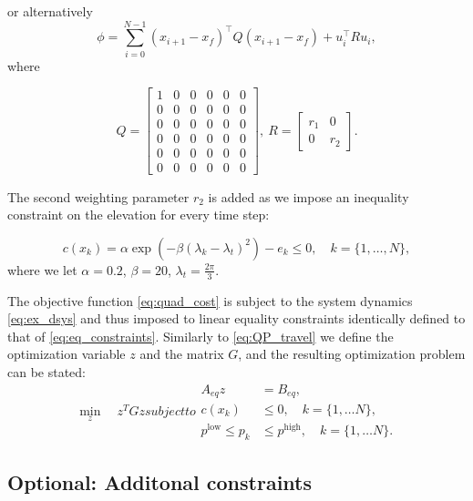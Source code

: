 or alternatively
\begin{equation}
	\label{eq:quad_cost}
	\phi = \sum_{i=0}^{N-1} (x_{i+1}-x_f)^\top Q(x_{i+1}-x_f) + u_i^\top R u_i,
\end{equation}
where

\begin{equation}
Q = \begin{bmatrix}1&0&0&0&0&0\\0&0&0&0&0&0\\0&0&0&0&0&0\\0&0&0&0&0&0\\0&0&0&0&0&0\\0&0&0&0&0&0\end{bmatrix}, \ R = \begin{bmatrix}r_1&0\\0&r_2\end{bmatrix}.
\end{equation}

 The second weighting parameter $r_2$ is added as we impose an inequality constraint on the elevation for every time step:

\begin{equation}
	\label{eq:cons}
	c(x_k) = \alpha \exp{\left(-\beta\left(\lambda_k - \lambda_t\right)^2\right)} - e_k \le 0, \quad k = \{1, \dots , N\},
\end{equation}
where we let $\alpha = 0.2$, $\beta = 20$, $\lambda_t = \frac{2\pi}{3}$.

The objective function \eqref{eq:quad_cost} is subject to the system dynamics \eqref{eq:ex_dsys} and thus imposed to linear equality constraints identically defined to that of \eqref{eq:eq_constraints}. Similarly to \eqref{eq:QP_travel} we define the optimization variable $z$ and the matrix $G$, and the resulting optimization problem can be stated:
\begin{subequations}
\label{eq:NOP}
	\begin{equation}
		\min_z \quad z^T G z
	\end{equation}
subject to
\begin{align}
	A_{eq} z &= B_{eq}, \\
	c(x_k) &\le 0, \quad k = \{1, \dots N\},\\
	p^{\textrm{low}} \le p_k &\le p^{\textrm{high}}, \quad k = \{1, \dots N\}.
\end{align}
\end{subequations}


\subsection{Optional: Additonal constraints}

